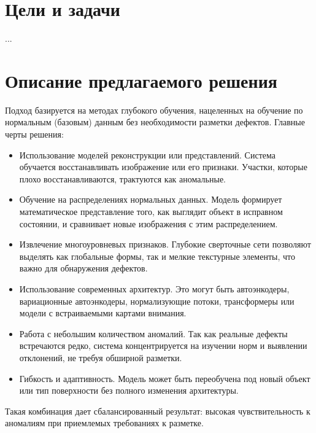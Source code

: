 \documentclass[14 pt,a4paper]{article}
\begin{document}
\section{Цели и задачи}
...

\section{Описание предлагаемого решения}
Подход базируется на методах глубокого обучения, нацеленных на обучение по нормальным (базовым) данным без необходимости разметки дефектов. Главные черты решения:
\begin{itemize}
	\item Использование моделей реконструкции или представлений. Система обучается восстанавливать изображение или его признаки. Участки, которые плохо восстанавливаются, трактуются как аномальные.

	\item Обучение на распределениях нормальных данных. Модель формирует математическое представление того, как выглядит объект в исправном состоянии, и сравнивает новые изображения с этим распределением.

	\item Извлечение многоуровневых признаков. Глубокие сверточные сети позволяют выделять как глобальные формы, так и мелкие текстурные элементы, что важно для обнаружения дефектов.

	\item Использование современных архитектур. Это могут быть автоэнкодеры, вариационные автоэнкодеры, нормализующие потоки, трансформеры или модели с встраиваемыми картами внимания.

	\item Работа с небольшим количеством аномалий. Так как реальные дефекты встречаются редко, система концентрируется на изучении норм и выявлении отклонений, не требуя обширной разметки.

	\item Гибкость и адаптивность. Модель может быть переобучена под новый объект или тип поверхности без полного изменения архитектуры.
\end{itemize}
Такая комбинация дает сбалансированный результат: высокая чувствительность к аномалиям при приемлемых требованиях к разметке.
\end{document}
